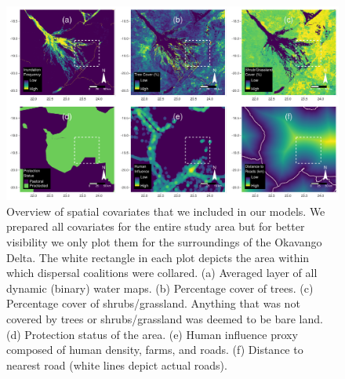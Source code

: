 \documentclass[abstract=on,10pt,a4paper,bibliography=totocnumbered]{article}
\begin{document}
\begin{figure}[h]
  \begin{center}
    \includegraphics[width = \textwidth]{99_Covariates.pdf}
    \caption{Overview of spatial covariates that we included in our models. We
    prepared all covariates for the entire study area but for better visibility
    we only plot them for the surroundings of the Okavango Delta. The white
    rectangle in each plot depicts the area within which dispersal coalitions
    were collared. (a) Averaged layer of all dynamic (binary) water maps. (b)
    Percentage cover of trees. (c) Percentage cover of shrubs/grassland.
    Anything that was not covered by trees or shrubs/grassland was deemed to be
    bare land. (d) Protection status of the area. (e) Human influence proxy
    composed of human density, farms, and roads. (f) Distance to nearest road
    (white lines depict actual roads).}
    \label{Covariates}
  \end{center}
\end{figure}
\end{document}
